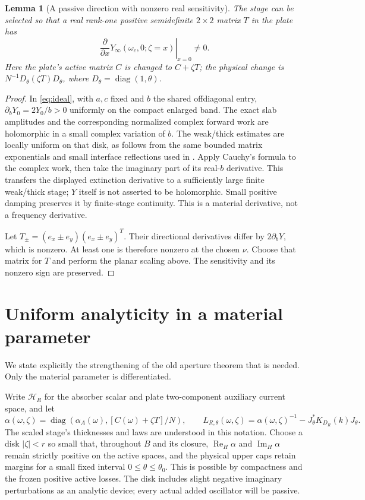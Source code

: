 \documentclass[11pt]{article}
\newtheorem{lemma}{Lemma}
\newcommand{\ReH}{\operatorname{Re}_{H}}
\newcommand{\ImH}{\operatorname{Im}_{H}}
\newcommand{\abs}[1]{\left|#1\right|}
\begin{document}
\begin{lemma}[A passive direction with nonzero real sensitivity]\label{lem:sensitivity}
The stage can be selected so that a real rank-one positive semidefinite
$2\times2$ matrix $T$ in the plate has
\[
 \left.\frac{\partial}{\partial x}
 Y_\infty(\omega_c,0;\zeta=x)\right|_{x=0}\ne0.
\]
Here the plate's active matrix $C$ is changed to $C+\zeta T$;
the physical change is $N^{-1}D_\theta(\zeta T)D_\theta$,
where $D_\theta=\operatorname{diag}(1,\theta)$.
\end{lemma}
\begin{proof}
In \eqref{eq:ideal}, with $a,c$ fixed and $b$ the shared offdiagonal entry,
$\partial_bY_0=2Y_0/b>0$ uniformly on the compact enlarged band.
The exact slab amplitudes and the corresponding normalized complex forward
work are holomorphic in a small complex variation of $b$. The weak/thick
estimates are locally uniform on that disk, as follows from the same bounded
matrix exponentials and small interface reflections used in \cite{strict}.
Apply Cauchy's formula to the complex work, then take the imaginary part of
its real-$b$ derivative. This transfers the displayed extinction derivative
to a sufficiently large finite weak/thick stage; $Y$ itself is not asserted
to be holomorphic. Small positive damping preserves it by finite-stage
continuity. This is a material derivative, not a frequency derivative.

Let $T_\pm=(e_x\pm e_y)(e_x\pm e_y)^T$. Their directional derivatives differ by
$2\partial_bY$, which is nonzero. At least one is therefore nonzero at the
chosen $\nu$. Choose that matrix for $T$ and perform the planar scaling above.
The sensitivity and its nonzero sign are preserved.
\end{proof}

\section{Uniform analyticity in a material parameter}
We state explicitly the strengthening of the old aperture theorem that is
needed. Only the material parameter is differentiated.

Write $\mathcal H_R$ for the absorber scalar and plate two-component auxiliary
current space, and let
\[
 \alpha(\omega,\zeta)
 =\operatorname{diag}\!\left(\alpha_A(\omega),
           [C(\omega)+\zeta T]/N\right),\qquad
 L_{R,\theta}(\omega,\zeta)=
 \alpha(\omega,\zeta)^{-1}-J_\theta^*K_{D_R}(k)J_\theta .
\]
The scaled stage's thicknesses and laws are understood in this notation.
Choose a disk $\abs\zeta<r$ so small that, throughout $B$ and its closure,
$\ReH\alpha$ and $\ImH\alpha$ remain strictly positive on the active spaces,
and the physical upper caps retain margins for a small fixed interval
$0\le\theta\le\theta_0$.
This is possible by compactness and the frozen positive active losses.
The disk includes slight negative imaginary perturbations as an analytic
device; every actual added oscillator will be passive.
\end{document}
